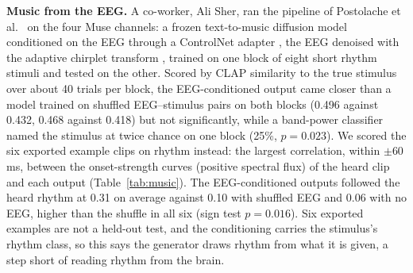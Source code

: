 \documentclass[conference]{IEEEtran}
\begin{document}
\textbf{Music from the EEG.} A co-worker, Ali Sher, ran the pipeline of Postolache et al.\ \cite{postolache2024naturalistic} on the four Muse channels: a frozen text-to-music diffusion model \cite{liu2023audioldm2} conditioned on the EEG through a ControlNet adapter \cite{zhang2023controlnet}, the EEG denoised with the adaptive chirplet transform \cite{mann1995chirplet, kumar2026act, mann2025sleep}, trained on one block of eight short rhythm stimuli and tested on the other. Scored by CLAP similarity to the true stimulus \cite{wu2023clap} over about 40 trials per block, the EEG-conditioned output came closer than a model trained on shuffled EEG--stimulus pairs on both blocks (0.496 against 0.432, 0.468 against 0.418) but not significantly, while a band-power classifier named the stimulus at twice chance on one block (25\%, $p = 0.023$). We scored the six exported example clips on rhythm instead: the largest correlation, within $\pm$60\,ms, between the onset-strength curves (positive spectral flux) of the heard clip and each output (Table~\ref{tab:music}). The EEG-conditioned outputs followed the heard rhythm at 0.31 on average against 0.10 with shuffled EEG and 0.06 with no EEG, higher than the shuffle in all six (sign test $p = 0.016$). Six exported examples are not a held-out test, and the conditioning carries the stimulus's rhythm class, so this says the generator draws rhythm from what it is given, a step short of reading rhythm from the brain.

\begin{table}[t]
\caption{Rhythm similarity of the six exported examples to the heard clip (onset-strength correlation, best lag within $\pm$60\,ms). Classify-then-play returns a stored example of the predicted class; for both fast examples that file is the heard clip itself.}
\label{tab:music}
\centering
\scriptsize
\setlength{\tabcolsep}{3.5pt}
\end{table}
\end{document}
